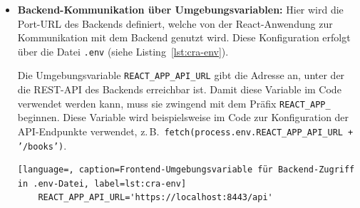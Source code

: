 \begin{itemize}
\begin{lstlisting}[language=Java, caption=Einstiegspunkt der React-Anwendung, label=lst:react-index, breaklines=true]
	const stripePromise = loadStripe('my_stripe_public_key');
	
	const root = ReactDOM.createRoot(
	document.getElementById('root') as HTMLElement
	);
	root.render(
	<BrowserRouter>
	<Elements stripe={stripePromise}>
	<App />
	</Elements>
	</BrowserRouter>
	);
	\end{lstlisting}
	
	Die Datei \texttt{index.tsx} dient als zentrales Einstiegsskript für die React-Anwendung. Sie importiert zunächst alle notwendigen Module und Abhängigkeiten wie React selbst, den ReactDOM-Client, die globale CSS-Datei, die Hauptkomponente \texttt{App} sowie zusätzliche Bibliotheken für Routing (\texttt{react-router-dom}), UI-Icons (Bootstrap Icons), Zahlungsintegration (Stripe) und Internationalisierung (\texttt{i18n}).
	
	Im nächsten Schritt wird Stripe über \texttt{loadStripe} mit dem öffentlichen Schlüssel initialisiert und in einer Promise-Variable gespeichert. Anschließend wird mithilfe von \texttt{ReactDOM.createRoot(...)} eine sogenannte „Root“-Instanz erzeugt, welche das \texttt{<div>} mit der ID \texttt{root} im HTML-Dokument referenziert. Das \texttt{<div>} mit der ID \texttt{root} befindet sich in der Datei \texttt{public/index.html}.
	
	Im letzten Schritt erfolgt das eigentliche Rendern der Anwendung. Hierbei wird die Komponente \texttt{<App />} in den Kontext von \texttt{<BrowserRouter>} und \texttt{<Elements>} eingebettet, um Routing- und Zahlungsfunktionen global bereitzustellen.
	
\item \textbf{Backend-Kommunikation über Umgebungsvariablen:} Hier wird die Port-URL des Backends definiert, welche von der React-Anwendung zur Kommunikation mit dem Backend genutzt wird. Diese Konfiguration erfolgt über die Datei \texttt{.env} (siehe Listing~\ref{lst:cra-env}).  

Die Umgebungsvariable \texttt{REACT\_APP\_API\_URL} gibt die Adresse an, unter der die REST-API des Backends erreichbar ist. Damit diese Variable im Code verwendet werden kann, muss sie zwingend mit dem Präfix \texttt{REACT\_APP\_} beginnen.
Diese Variable wird beispielsweise im Code zur Konfiguration der API-Endpunkte verwendet, z.\,B.\ \texttt{fetch(process.env.REACT\_APP\_API\_URL + '/books')}.


\begin{lstlisting}[language=, caption=Frontend-Umgebungsvariable für Backend-Zugriff in .env-Datei, label=lst:cra-env]
	REACT_APP_API_URL='https://localhost:8443/api'
\end{lstlisting}

	
\end{itemize}

